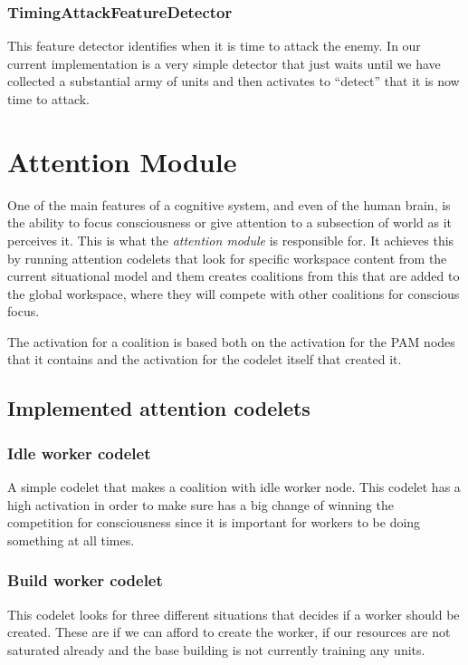 \subsubsection{TimingAttackFeatureDetector}
This feature detector identifies when it is time to attack the enemy. In our current implementation is a very simple detector that just waits until we have collected a substantial army of units and then activates to ``detect'' that it is now time to attack.

\section{Attention Module}
One of the main features of a cognitive system, and even of the human brain, is the ability to focus consciousness or give attention to a subsection of world as it perceives it. This is what the {\em attention module} is responsible for. It achieves this by running attention codelets that look for specific workspace content from the current situational model and them creates coalitions from this that are added to the global workspace, where they will compete with other coalitions for conscious focus.

The activation for a coalition is based both on the activation for the PAM nodes that it contains and the activation for the codelet itself that created it.

\subsection{Implemented attention codelets}
\subsubsection{Idle worker codelet}
A simple codelet that makes a coalition with idle worker node. This codelet has a high activation in order to make sure has a big change of winning the competition for consciousness since it is important for workers to be doing something at all times. 

\subsubsection{Build worker codelet}
This codelet looks for three different situations that decides if a worker should be created. These are if we can afford to create the worker, if our resources are not saturated already and the base building is not currently training any units. 

